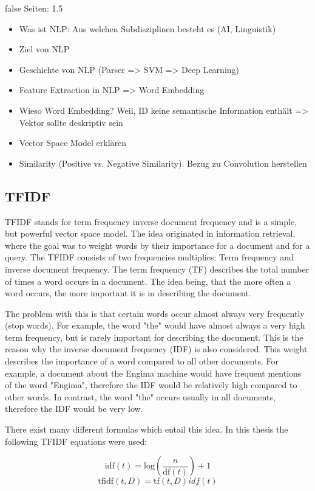 \documentclass[draft,final,oneside]{vutinfth} %
\begin{document}
\if false
Seiten: 1.5
\begin{itemize}
\item Was ist NLP: Aus welchen Subdisziplinen besteht es (AI, Linguistik)
\item Ziel von NLP
\item Geschichte von NLP (Parser => SVM => Deep Learning)
\item Feature Extraction in NLP => Word Embedding
\item Wieso Word Embedding? Weil, ID keine semantische Information enthält => Vektor sollte deskriptiv sein
\item Vector Space Model erklären
\item Similarity (Positive vs. Negative Similarity). Bezug zu Convolution herstellen
\end{itemize}

\fi

\subsection{TFIDF}


TFIDF stands for term frequency inverse document frequency and is a simple, but powerful vector space model. The idea originated in information retrieval, where the goal was to weight words by their importance for a document and for a query. The TFIDF consists of two frequencies multiplies: Term frequency and inverse document frequency. The term frequency (TF) describes the total number of times a word occurs in a document. The idea being, that the more often a word occurs, the more important it is in describing the document.

The problem with this is that certain words occur almost always very frequently (stop words). For example, the word "the" would have almost always a very high term frequency, but is rarely important for describing the document. This is the reason why the inverse document frequency (IDF) is also considered. This weight describes the importance of a word compared to all other documents. For example, a document about the Engima machine would have frequent mentions of the word "Engima", therefore the IDF would be relatively high compared to other words. In contrast, the word "the" occurs usually in all documents, therefore the IDF would be very low.

There exist many different formulas which entail this idea. In this thesis the following TFIDF equations were used:

\begin{equation}
\text{idf}(t) = \text{log} \left(\dfrac{n}{\text{df}(t)} \right) + 1
\end{equation}
\begin{equation}
\text{tfidf}(t, D) = \text{tf}(t, D)idf(t)
\end{equation}
\end{document}

